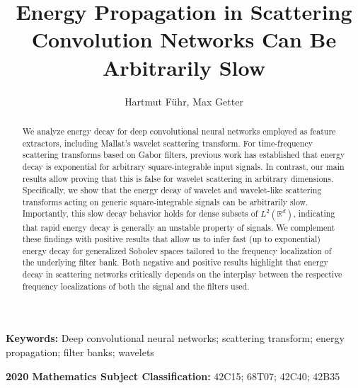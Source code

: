 \documentclass[11pt]{amsart}
\newenvironment{proof sketch} {\textit{Proof sketch.}}{}
\begin{document}
\title[Energy Propagation in Scattering Convolution Networks]
{Energy Propagation in Scattering Convolution Networks Can Be Arbitrarily Slow}
\author{Hartmut F\"uhr, Max Getter}
\address{Chair for Geometry and Analysis, RWTH Aachen University, D-52062 Aachen, Germany}

\maketitle

\vspace*{-2em}

\begin{abstract}
  We analyze energy decay for deep convolutional neural networks employed as feature extractors, including Mallat's wavelet scattering transform. For time-frequency scattering transforms based on Gabor filters, previous work has established that energy decay is exponential for arbitrary square-integrable input signals. In contrast, our main results allow proving that this is false for wavelet scattering in arbitrary dimensions. Specifically, we show that the energy decay of wavelet and wavelet-like scattering transforms acting on generic square-integrable signals can be arbitrarily slow. Importantly, this slow decay behavior holds for dense subsets of $L^2(\mathbb{R}^d)$, indicating that rapid energy decay is generally an unstable property of signals. We complement these findings with positive results that allow us to infer fast (up to exponential) energy decay for generalized Sobolev spaces tailored to the frequency localization of the underlying filter bank. Both negative and positive results highlight that energy decay in scattering networks critically depends on the interplay between the respective frequency localizations of both the signal and the filters used. 
  \end{abstract}
  \vspace*{1em}
  
  \noindent \textbf{\small Keywords:}{\small {}  Deep convolutional neural networks; scattering transform; energy propagation; filter banks; wavelets}{\small \par}
  
  \noindent \textbf{\small 2020 Mathematics Subject Classification:}{\small {} 42C15; 68T07; 42C40; 42B35}{\small \par}
  
  \begingroup
  \renewcommand\thefootnote{}
  \addtocounter{footnote}{-1}
  \endgroup
  
\end{document}
